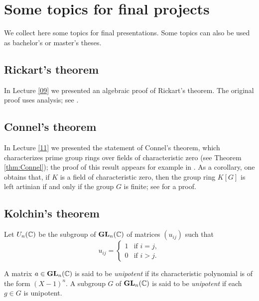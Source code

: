 \section{Some topics for final projects}

\pagestyle{plain}
\fancyhf{}
\fancyfoot[CE,CO]{\leftmark}
\fancyfoot[LE,RO]{\thepage}


We collect here some topics for final presentations. Some topics
can also be used as bachelor's or master's theses. 

\subsection*{Rickart's theorem}

In Lecture \ref{09} we presented an algebraic proof of Rickart's theorem. 
The original proof uses analysis; see \cite[(6.4) of Chapter II]{MR1838439}. 

\subsection*{Connel's theorem}

In Lecture \ref{11} we presented the statement of Connel's theorem, which
characterizes prime group rings over fields of characteristic zero 
(see Theorem \ref{thm:Connel}); the proof of this  
result appears for example in \cite[Theorem 2.10 of Chapter 4]{MR798076}. 
As a corollary, one obtains 
that, if $K$ is a field of characteristic zero,
then the group ring $K[G]$ is left artinian if and only if the group
$G$ is finite; see 
\cite[Theorem 1.1 of Chapter 10]{MR798076} for a proof. 

\subsection*{Kolchin's theorem}

Let $U_n(\mathbb{C})$ be the subgroup of $\mathbf{GL}_n(\mathbb{C})$ 
of matrices $(u_{ij})$ such that 
\[
u_{ij}=\begin{cases}
1&\text{if $i=j$},\\
0&\text{if $i>j$}.\end{cases}
\]

A matrix $a\in\mathbf{GL}_n(\mathbb{C})$ is said to be \emph{unipotent} 
if its characteristic polynomial is of the form $(X-1)^n$. 
A subgroup $G$ of $\mathbf{GL}_n(\mathbb{C})$ is said to be \emph{unipotent} if
each $g\in G$ is unipotent. 

